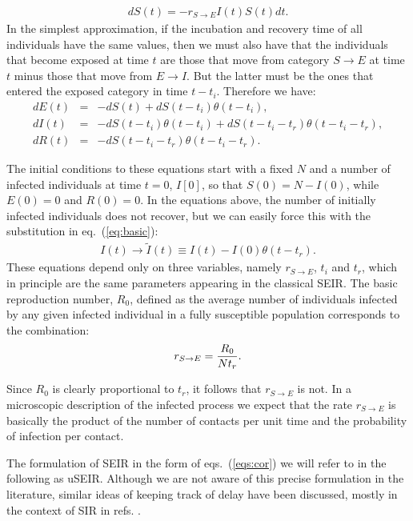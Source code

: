 \documentclass[a4paper,oneside,11pt]{article}
\begin{document}
\begin{eqnarray}
d S(t) = - r_{S\rightarrow E} I(t) S(t) dt.
\label{eq:basic}
\end{eqnarray}
In the simplest approximation, if the incubation and recovery time of all individuals have the same values, then we must also have that the individuals that become exposed at time
$t$ are those that move from category $S\rightarrow E$ at time $t$ minus those that move from $E\rightarrow I$. But the latter must be the ones that entered the exposed category in time $t-t_i$. Therefore we have:
\begin{eqnarray}
d E(t) &=& -d S(t) + d S(t-t_i) \theta(t-t_i) ,\nonumber\\
d I(t) &=& -d S(t-t_i) \theta(t-t_i)+ d S(t-t_i-t_r) \theta(t-t_i-t_r),\nonumber\\
d R(t) &=& - d S(t - t_i - t_r) \theta(t-t_i-t_r).\nonumber
\label{eqs:cor}
\end{eqnarray}

The initial conditions to these equations start with a fixed $N$ and a number of infected individuals at time $t=0$, $I[0]$, so that $S(0) = N-I(0)$, while $E(0)=0$ and $R(0)=0$.
In the  equations above, the number of initially infected individuals does not recover, but we can easily force this with the substitution in eq.~(\ref{eq:basic}):
\begin{eqnarray}
I(t) \rightarrow \tilde{I}(t) \equiv I(t) - I(0) \theta(t-t_r).
\end{eqnarray}
These equations depend only on three variables, namely $r_{S\rightarrow E}$, $t_i$ and $t_r$, which in principle are the same parameters appearing in the classical SEIR.
The basic reproduction number, $R_0$, defined as the average number of individuals infected by any given infected individual in a fully susceptible population corresponds to the combination:
\begin{eqnarray}
r_{S\rightarrow E} = {R_0\over N t_r}.
\end{eqnarray}

Since $R_0$ is clearly proportional to $t_r$, it follows that $r_{S\rightarrow E}$ is not. In a microscopic description of the infected process we expect that the rate $r_{S\rightarrow E}$ is basically the product of the number of contacts per unit time and the probability of infection per contact.

The  formulation of SEIR in the form of eqs.~(\ref{eqs:cor}) we will refer to in the following as uSEIR. Although we are not aware of this precise formulation in the literature, similar ideas of keeping track of delay have been discussed, mostly in the context of SIR in refs. \cite{}.
\end{document}
